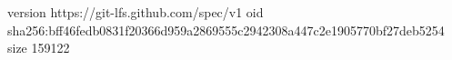version https://git-lfs.github.com/spec/v1
oid sha256:bff46fedb0831f20366d959a2869555c2942308a447c2e1905770bf27deb5254
size 159122
